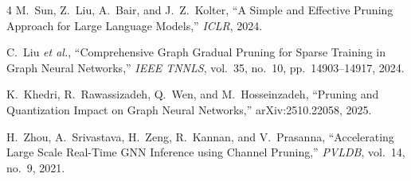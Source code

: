 \documentclass[10pt]{article}
\begin{document}
\begingroup\footnotesize
\begin{thebibliography}{4}
 M.~Sun, Z.~Liu, A.~Bair, and J.~Z.~Kolter, ``A Simple and Effective Pruning Approach for Large Language Models,'' \emph{ICLR}, 2024.

 C.~Liu \emph{et al.}, ``Comprehensive Graph Gradual Pruning for Sparse Training in Graph Neural Networks,'' \emph{IEEE TNNLS}, vol.~35, no.~10, pp.~14903--14917, 2024.

 K.~Khedri, R.~Rawassizadeh, Q.~Wen, and M.~Hosseinzadeh, ``Pruning and Quantization Impact on Graph Neural Networks,'' arXiv:2510.22058, 2025.

 H.~Zhou, A.~Srivastava, H.~Zeng, R.~Kannan, and V.~Prasanna, ``Accelerating Large Scale Real-Time GNN Inference using Channel Pruning,'' \emph{PVLDB}, vol.~14, no.~9, 2021.
\end{thebibliography}
\endgroup
\end{document}

